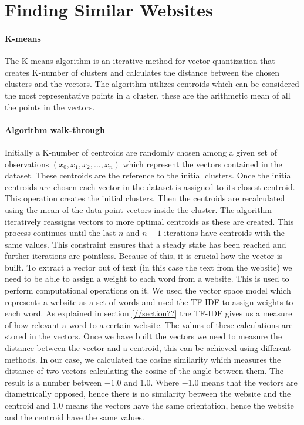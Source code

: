 \section{Finding Similar Websites}
\paragraph{K-means}
The K-means algorithm is an iterative method for vector quantization that creates K-number of clusters and calculates the distance between the chosen clusters and the vectors. 
The algorithm utilizes centroids which can be considered the most representative points in a cluster, these are the arithmetic mean of all the points in the vectors.
\paragraph{Algorithm walk-through}
Initially a K-number of centroids are randomly chosen among a given set of observations $(x_0,x_1,x_2,...,x_n)$ which represent the vectors contained in the dataset. These centroids are the reference to the initial clusters. Once the initial centroids are chosen each vector in the dataset is assigned to its closest centroid. This operation creates the initial clusters. Then the centroids are recalculated using the mean of the data point vectors inside the cluster. 
The algorithm iteratively reassigns vectors to more optimal centroids as these are created.
This process continues until the last $n$ and $n-1$ iterations have centroids with the same values. 
This constraint ensures that a steady state has been reached and further iterations are pointless.
Because of this, it is crucial how the vector is built. To extract a vector out of text (in this case the text from the website) we need to be able to assign a weight to each word from a website. This is used to perform computational operations on it. We used the vector space model which represents a website as a set of words and used the TF-IDF to assign weights to each word. As explained in section \ref{//section??} the TF-IDF gives us a measure of how  relevant a word to a certain website. The values of these calculations are stored in the vectors.
Once we have built the vectors we need to measure the distance between the vector and a centroid, this can be achieved using different methods. In our case, we calculated the cosine similarity which measures the distance of two vectors calculating the cosine of the angle between them. The result is a number between $-1.0$ and $1.0$. Where $-1.0$ means that the vectors are diametrically opposed, hence there is no similarity between the website and the centroid and $1.0$ means the vectors have the same orientation, hence the website and the centroid have the same values.
